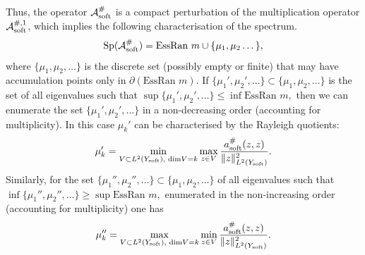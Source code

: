 \documentclass[11pt]{article}
\newcommand\soft{{\rm soft}}
\def\AA{\mathcal{A}}
\DeclareMathOperator{\Sp}{Sp}
\theoremstyle{remark}
\begin{document}
Thus, the operator $\AA_\soft^\#$ is a compact perturbation of the multiplication operator $\AA_\soft^{\#,1}$, which implies the following characterisation of the spectrum.
\begin{equation*}
\Sp (\AA_\soft^\# )=\textrm{EssRan } m \cup\{\mu_1, \mu_2\dots \},	
\end{equation*} 	
where  $\{\mu_1,\mu_2,\dots\}$ is the discrete set (possibly empty or finite) that may  have accumulation points only in $\partial (\textrm{EssRan } m)$.
If $\{\mu_1',\mu_2',\dots\} \subset \{\mu_1,\mu_2,\dots\}$ is the set of all eigenvalues such that
$\sup\{\mu_1',\mu_2',\dots\} \leq \inf \textrm{EssRan } m, $ then we can enumerate the set $\{\mu_1',\mu_2',\dots\}$ in a non-decreasing order (accounting for multiplicity). In this case $\mu_k'$ can be characterised by the Rayleigh quotients:
\begin{equation} \label{representation}
 \mu_k'=\min_{V\subset L^2(Y_\soft ), \textrm{ dim} V=k}\max_{z \in V}\frac{a_\soft^\#(z,z)}{\|z\|_{L^2(Y_\soft )}^2}.
 \end{equation}
Similarly, for the set  $\{\mu_1'',\mu_2'',\dots\} \subset \{\mu_1,\mu_2,\dots\}$ of all eigenvalues such that
$\inf\{\mu_1'',\mu_2'',\dots\} \geq \sup \textrm{EssRan } m, $ enumerated  in the non-increasing order (accounting for multiplicity) one has
\begin{equation} \label{representation22}
	\mu_k''=\max_{V\subset L^2(Y_\soft ), \textrm{ dim} V=k}\min_{z \in V}\frac{a_\soft^\#(z,z)}{\|z\|_{L^2(Y_\soft )}^2}.
\end{equation}
\end{document}
